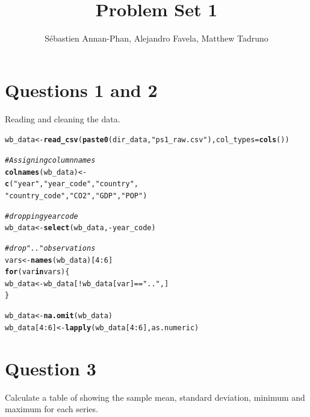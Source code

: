 \documentclass[english, 11pt]{article}\usepackage[]{graphicx}\usepackage[]{color}
\makeatletter
\newcommand{\hlnum}[1]{\textcolor[rgb]{0.686,0.059,0.569}{#1}}%
\newcommand{\hlstr}[1]{\textcolor[rgb]{0.192,0.494,0.8}{#1}}%
\newcommand{\hlcom}[1]{\textcolor[rgb]{0.678,0.584,0.686}{\textit{#1}}}%
\newcommand{\hlopt}[1]{\textcolor[rgb]{0,0,0}{#1}}%
\newcommand{\hlstd}[1]{\textcolor[rgb]{0.345,0.345,0.345}{#1}}%
\newcommand{\hlkwa}[1]{\textcolor[rgb]{0.161,0.373,0.58}{\textbf{#1}}}%
\newcommand{\hlkwb}[1]{\textcolor[rgb]{0.69,0.353,0.396}{#1}}%
\newcommand{\hlkwc}[1]{\textcolor[rgb]{0.333,0.667,0.333}{#1}}%
\newcommand{\hlkwd}[1]{\textcolor[rgb]{0.737,0.353,0.396}{\textbf{#1}}}%
\newenvironment{kframe}{%
 \def\at@end@of@kframe{}%
 \ifinner\ifhmode%
  \def\at@end@of@kframe{\end{minipage}}%
  \begin{minipage}{\columnwidth}%
 \fi\fi%
 \def\FrameCommand##1{\hskip\@totalleftmargin \hskip-\fboxsep
 \colorbox{shadecolor}{##1}\hskip-\fboxsep
     \hskip-\linewidth \hskip-\@totalleftmargin \hskip\columnwidth}%
 \MakeFramed {\advance\hsize-\width
   \@totalleftmargin\z@ \linewidth\hsize
   \@setminipage}}%
 {\par\unskip\endMakeFramed%
 \at@end@of@kframe}
\newenvironment{knitrout}{}{} %
\makeatother
\begin{document}
\title{Problem Set 1}
\author{Sébastien Annan-Phan, Alejandro Favela, Matthew Tadruno }

\maketitle






\newpage
\noindent \section*{Questions 1 and 2} Reading and cleaning the data.
\begin{knitrout}\small
{}\color{fgcolor}\begin{kframe}
\begin{alltt}
\hlstd{wb_data} \hlkwb{<-}\hlkwd{read_csv}\hlstd{(}\hlkwd{paste0}\hlstd{(dir_data,} \hlstr{"ps1_raw.csv"}\hlstd{),} \hlkwc{col_types}\hlstd{=}\hlkwd{cols}\hlstd{())}

\hlcom{#Assigning column names }
\hlkwd{colnames}\hlstd{(wb_data)} \hlkwb{<-}
  \hlkwd{c}\hlstd{(}\hlstr{"year"}\hlstd{,} \hlstr{"year_code"}\hlstd{,} \hlstr{"country"}\hlstd{,}
    \hlstr{"country_code"}\hlstd{,} \hlstr{"CO2"}\hlstd{,} \hlstr{"GDP"}\hlstd{,} \hlstr{"POP"}\hlstd{)}

\hlcom{#dropping year code }
\hlstd{wb_data} \hlkwb{<-} \hlkwd{select}\hlstd{(wb_data,} \hlopt{-}\hlstd{year_code)}

\hlcom{#drop ".." observations}
\hlstd{vars}\hlkwb{<-}\hlkwd{names}\hlstd{(wb_data)[}\hlnum{4}\hlopt{:}\hlnum{6}\hlstd{]}
\hlkwa{for} \hlstd{(var} \hlkwa{in} \hlstd{vars) \{}
  \hlstd{wb_data} \hlkwb{<-} \hlstd{wb_data[}\hlopt{!}\hlstd{wb_data[var]} \hlopt{==} \hlstr{".."}\hlstd{, ]}
\hlstd{\}}

\hlstd{wb_data} \hlkwb{<-} \hlkwd{na.omit}\hlstd{(wb_data)}
\hlstd{wb_data[}\hlnum{4}\hlopt{:}\hlnum{6}\hlstd{]} \hlkwb{<-}\hlkwd{lapply}\hlstd{(wb_data[}\hlnum{4}\hlopt{:}\hlnum{6}\hlstd{], as.numeric)}
\end{alltt}
\end{kframe}
\end{knitrout}

\noindent \section*{Question 3} Calculate a table of showing the sample mean, standard deviation, minimum and maximum for each series.
\end{document}
